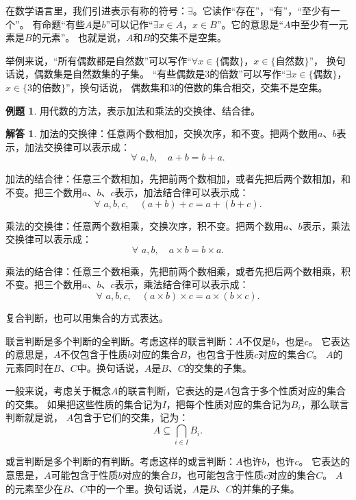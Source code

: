 \documentclass[12pt,UTF8]{ctexbook}
\theoremstyle{definition}
\newtheorem{et}{例题}[section]
\newtheorem*{so}{解答}
\theoremstyle{plain}
\begin{document}
在数学语言里，我们引进表示有称的符号：$\exists$。它读作“存在”，“有”，“至少有一个”。
有命题“有些$A$是$b$”可以记作“$\exists x \in A$，$x \in B$”。它的意思是“$A$中至少有一元素是$B$的元素”。
也就是说，$A$和$B$的交集不是空集。

举例来说，“所有偶数都是自然数”可以写作“$\forall x \in \{\mbox{偶数}\}$，$x \in \{\mbox{自然数}\}$”，
换句话说，偶数集是自然数集的子集。
“有些偶数是$3$的倍数”可以写作“$\exists x \in \{\mbox{偶数}\}$，$x \in \{3\mbox{的倍数}\}$”，换句话说，
偶数集和$3$的倍数的集合相交，交集不是空集。

\begin{et}
    用代数的方法，表示加法和乘法的交换律、结合律。
\end{et}

\begin{so}
    加法的交换律：任意两个数相加，交换次序，和不变。把两个数用$a$、$b$表示，加法交换律可以表示成：
    $$ \forall \,\, a, b, \quad a + b = b + a. $$
    
    加法的结合律：任意三个数相加，先把前两个数相加，或者先把后两个数相加，和不变。把三个数用$a$、$b$、$c$表示，加法结合律可以表示成：
    $$ \forall \,\, a, b, c, \quad (a + b) + c = a + (b + c). $$
    
    乘法的交换律：任意两个数相乘，交换次序，积不变。把两个数用$a$、$b$表示，乘法交换律可以表示成：
    $$ \forall \,\, a, b, \quad a \times b = b \times a. $$
    
    乘法的结合律：任意三个数相乘，先把前两个数相乘，或者先把后两个数相乘，积不变。把三个数用$a$、$b$、$c$表示，乘法结合律可以表示成：
    $$ \forall \,\, a, b, c, \quad (a \times b) \times c = a \times (b \times c). $$
\end{so}

复合判断，也可以用集合的方式表达。

联言判断是多个判断的全判断。考虑这样的联言判断：$A$不仅是$b$，也是$c$。
它表达的意思是，$A$不仅包含于性质$b$对应的集合$B$，也包含于性质$c$对应的集合$C$。
$A$的元素同时在$B$、$C$中。换句话说，$A$是$B$、$C$的交集的子集。

一般来说，考虑关于概念$A$的联言判断，它表达的是$A$包含于多个性质对应的集合的交集。
如果把这些性质的集合记为$I$，把每个性质对应的集合记为$B_i$，那么联言判断就是说，
$A$包含于它们的交集，记为：
$$ A \subseteq \bigcap_{i\in I} B_i. $$

或言判断是多个判断的有判断。考虑这样的或言判断：$A$也许$b$，也许$c$。
它表达的意思是，$A$可能包含于性质$b$对应的集合$B$，也可能包含于性质$c$对应的集合$C$。
$A$的元素至少在$B$、$C$中的一个里。换句话说，$A$是$B$、$C$的并集的子集。
\end{document}
